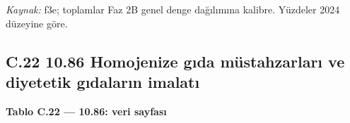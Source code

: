 \endgroup

\emph{Kaynak:} \etiketT{} f3e; toplamlar Faz 2B genel denge dağılımına kalibre. Yüzdeler 2024 düzeyine göre.

\hypertarget{nace_kartlar_10-12-c22-1086-homojenize-gux131da-muxfcstahzarlarux131-ve-diyetetik-gux131dalarux131n-imalatux131}{%
\subsection{C.22 10.86 Homojenize gıda müstahzarları ve diyetetik gıdaların imalatı}\label{nace_kartlar_10-12-c22-1086-homojenize-gux131da-muxfcstahzarlarux131-ve-diyetetik-gux131dalarux131n-imalatux131}}


\textbf{Tablo C.22 --- 10.86: veri sayfası}

\nopagebreak[4]

\begingroup\gbtablo\small

